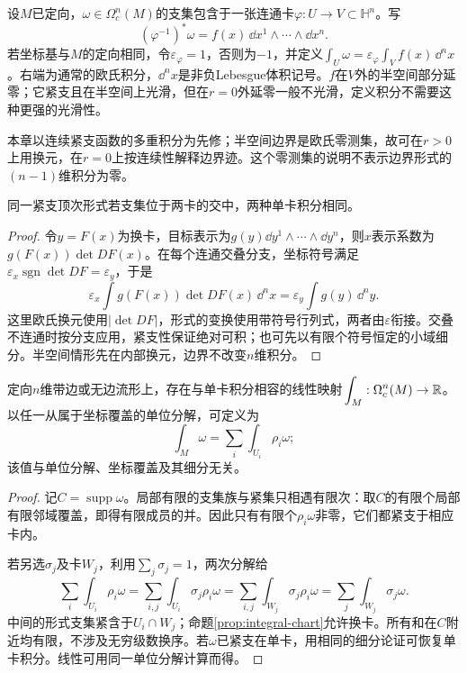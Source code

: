 \begin{definition}[单卡积分]
设$M$已定向，$\omega\in\Omega_c^n(M)$的支集包含于一张连通卡$\varphi:U\to V\subset\mathbb H^n$。写
\[
 (\varphi^{-1})^*\omega=f(x)\,\dd x^1\wedge\cdots\wedge\dd x^n.
\]
若坐标基与$M$的定向相同，令$\varepsilon_\varphi=1$，否则为$-1$，并定义$\int_U\omega=\varepsilon_\varphi\int_V f(x)\,\dd^n x$。右端为通常的欧氏积分，$\dd^n x$是非负Lebesgue体积记号。$f$在$V$外的半空间部分延零；它紧支且在半空间上光滑，但在$r=0$外延零一般不光滑，定义积分不需要这种更强的光滑性。
\end{definition}
本章以连续紧支函数的多重积分为先修；半空间边界是欧氏零测集，故可在$r>0$上用换元，在$r=0$上按连续性解释边界迹。这个零测集的说明不表示边界形式的$(n-1)$维积分为零。

\begin{proposition}[换卡与定向符号]\label{prop:integral-chart}
同一紧支顶次形式若支集位于两卡的交中，两种单卡积分相同。
\end{proposition}
\begin{proof}
令$y=F(x)$为换卡，目标表示为$g(y)\dd y^1\wedge\cdots\wedge\dd y^n$，则$x$表示系数为$g(F(x))\det DF(x)$。在每个连通交叠分支，坐标符号满足$\varepsilon_x\operatorname{sgn}\det DF=\varepsilon_y$，于是
\[
 \varepsilon_x\int g(F(x))\det DF(x)\,\dd^n x
 =\varepsilon_y\int g(y)\,\dd^n y.
\]
这里欧氏换元使用$|\det DF|$，形式的变换使用带符号行列式，两者由$\varepsilon$衔接。交叠不连通时按分支应用，紧支性保证绝对可积；也可先以有限个符号恒定的小域细分。半空间情形先在内部换元，边界不改变$n$维积分。
\end{proof}

\begin{theorem}[全局紧支积分]\label{thm:global-integral}
定向$n$维带边或无边流形上，存在与单卡积分相容的线性映射$\int_M:\Omega_c^n(M)\to\R$。以任一从属于坐标覆盖的单位分解，可定义为
\[
 \int_M\omega=\sum_i\int_{U_i}\rho_i\omega;
\]
该值与单位分解、坐标覆盖及其细分无关。
\end{theorem}
\begin{proof}
记$C=\operatorname{supp}\omega$。局部有限的支集族与紧集只相遇有限次：取$C$的有限个局部有限邻域覆盖，即得有限成员的并。因此只有有限个$\rho_i\omega$非零，它们都紧支于相应卡内。

若另选$\sigma_j$及卡$W_j$，利用$\sum_j\sigma_j=1$，两次分解给
\[
 \sum_i\int_{U_i}\rho_i\omega
 =\sum_{i,j}\int_{U_i}\sigma_j\rho_i\omega
 =\sum_{i,j}\int_{W_j}\sigma_j\rho_i\omega
 =\sum_j\int_{W_j}\sigma_j\omega.
\]
中间的形式支集紧含于$U_i\cap W_j$；命题\ref{prop:integral-chart}允许换卡。所有和在$C$附近均有限，不涉及无穷级数换序。若$\omega$已紧支在单卡，用相同的细分论证可恢复单卡积分。线性可用同一单位分解计算而得。
\end{proof}

